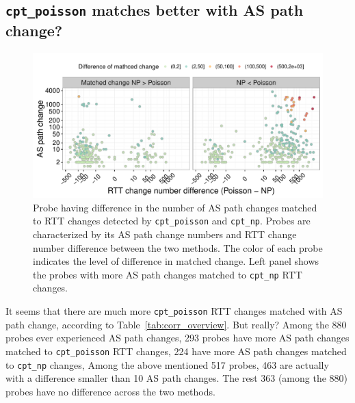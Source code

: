 \subsection{\texttt{cpt\_poisson} matches better with AS path change?}
\label{sec:as_match_diff}
\begin{figure}[!htb]
\centering
\includegraphics[width=.96\textwidth]{gfx/chap4/as_match_diff.pdf}
\caption{Probe having difference in the number of AS path changes matched to RTT changes detected by \texttt{cpt\_poisson} and \texttt{cpt\_np}. Probes are characterized by its AS path change numbers and RTT change number difference between the two methods. The color of each probe indicates the level of difference in matched change. Left panel shows the probes with more AS path changes matched to \texttt{cpt\_np} RTT changes.}
\label{fig:as_match_diff}
\end{figure}

It seems that there are much more \texttt{cpt\_poisson} RTT changes matched with AS path change, according to Table~\ref{tab:corr_overview}. But really?
Among the 880 probes ever experienced AS path changes, 293 probes have more AS path changes matched to \texttt{cpt\_poisson} RTT changes, 224 have more AS path changes matched to \texttt{cpt\_np} changes, 
Among the above mentioned 517 probes, 463 are actually with a difference smaller than 10 AS path changes.
The rest 363 (among the 880) probes have no difference across the two methods.

